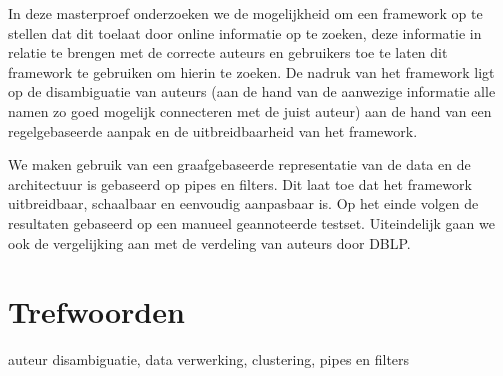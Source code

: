 {In deze masterproef onderzoeken we de mogelijkheid om een framework op te stellen dat dit toelaat door online informatie op te zoeken, deze informatie in relatie te brengen met de correcte auteurs en gebruikers toe te laten dit framework te gebruiken om hierin te zoeken. De nadruk van het framework ligt op de disambiguatie van auteurs (aan de hand van de aanwezige informatie alle namen zo goed mogelijk connecteren met de juist auteur) aan de hand van een regelgebaseerde aanpak en de uitbreidbaarheid van het framework.

We maken gebruik van een graafgebaseerde representatie van de data en de architectuur is gebaseerd op pipes en filters. Dit laat toe dat het framework uitbreidbaar, schaalbaar en eenvoudig aanpasbaar is. Op het einde volgen de resultaten gebaseerd op een manueel geannoteerde testset. Uiteindelijk gaan we ook de vergelijking aan met de verdeling van auteurs door DBLP.

\section*{Trefwoorden}

auteur disambiguatie, data verwerking, clustering, pipes en filters

}

\newpage %
